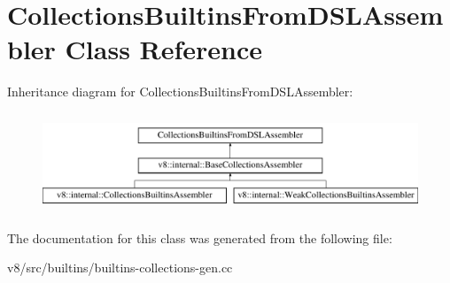\hypertarget{classCollectionsBuiltinsFromDSLAssembler}{}\section{Collections\+Builtins\+From\+D\+S\+L\+Assembler Class Reference}
\label{classCollectionsBuiltinsFromDSLAssembler}
Inheritance diagram for Collections\+Builtins\+From\+D\+S\+L\+Assembler\+:\begin{figure}[H]
\begin{center}
\leavevmode
\includegraphics[height=3.000000cm]{classCollectionsBuiltinsFromDSLAssembler}
\end{center}
\end{figure}


The documentation for this class was generated from the following file\+:\begin{DoxyCompactItemize}
\item 
v8/src/builtins/builtins-\/collections-\/gen.\+cc\end{DoxyCompactItemize}
